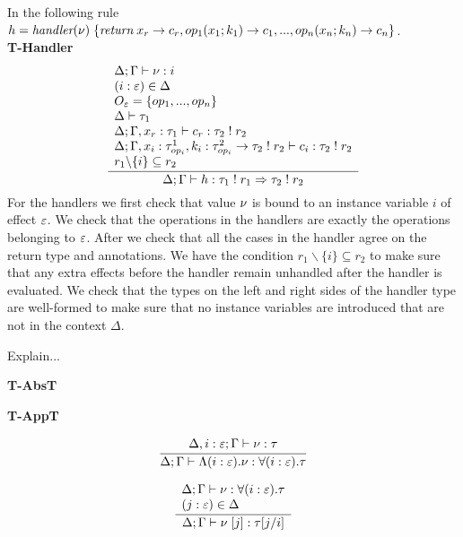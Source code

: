 \newpage
In the following rule \\$h = 
	\textit{handler} ( \nu ) \; \{
		\textit{return} \; x_r \rightarrow c_r,
		op_1(x_1 ; k_1) \rightarrow c_1,
		...,
		op_n(x_n ; k_n) \rightarrow c_n
	\}$.\\
\textbf{T-Handler}
\[\frac{
	\begin{array}{l}
	\Delta;\Gamma \vdash \nu : i \\
	(i:\varepsilon)\in\Delta \\
	O_\varepsilon = \{ op_1, ..., op_n \} \\
	\Delta \vdash \tau_1 \\
	\Delta;\Gamma, x_r : \tau_1 \vdash c_r : \tau_2 \; ! \; r_2 \\
	\Delta;\Gamma, x_i : \tau^1_{op_i}, k_i : \tau^2_{op_i} \rightarrow \tau_2 \; ! \; r_2 \vdash c_i : \tau_2 \; ! \; r_2 \\
	r_1 \backslash \{ i \} \subseteq r_2 \\
	\end{array}
}{
	\Delta;\Gamma \vdash h :
	\tau_1 \; ! \; r_1 \Rightarrow \tau_2 \; ! \; r_2
}\]
For the handlers we first check that value $\nu$ is bound to an instance variable $i$ of effect $\varepsilon$.
We check that the operations in the handlers are exactly the operations belonging to $\varepsilon$.
After we check that all the cases in the handler agree on the return type and annotations.
We have the condition $r_1 \backslash \{ i \} \subseteq r_2$ to make sure that any extra effects before the handler remain unhandled after the handler is evaluated.
We check that the types on the left and right sides of the handler type are well-formed to make sure that no instance variables are introduced that are not in the context $\Delta$.

Explain...\\
\begin{minipage}{0.5\textwidth}
\textbf{T-AbsT}
\end{minipage}
\begin{minipage}{0.5\textwidth}
\textbf{T-AppT}
\end{minipage}
\begin{minipage}{0.5\textwidth}
\[\frac{
	\begin{array}{l}
	\Delta,i:\varepsilon;\Gamma \vdash \nu : \tau \\
	\end{array}
}{
	\Delta;\Gamma \vdash \Lambda(i:\varepsilon) . \nu : \forall(i:\varepsilon) . \tau
}\]
\vspace{10pt}
\end{minipage}
\begin{minipage}{0.5\textwidth}
\[\frac{
	\begin{array}{l}
	\Delta;\Gamma \vdash \nu : \forall(i:\varepsilon) . \tau\\
	(j : \varepsilon) \in \Delta \\
	\end{array}
}{
	\Delta;\Gamma \vdash \nu \; [ j ] : \tau[j/i]
}\]
\vspace{10pt}
\end{minipage}

